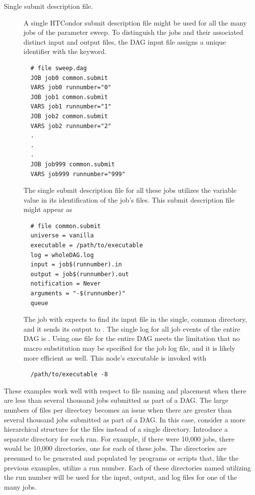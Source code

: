 \begin{description}
\item[Single submit description file.]
A single HTCondor submit description file might be used for all the many
jobs of the parameter sweep.
To distinguish the jobs and their associated distinct input and output files,
the DAG input file assigns a unique identifier with the  keyword.
\begin{verbatim}
  # file sweep.dag
  JOB job0 common.submit
  VARS job0 runnumber="0"
  JOB job1 common.submit
  VARS job1 runnumber="1"
  JOB job2 common.submit
  VARS job2 runnumber="2"
  .
  .
  .
  JOB job999 common.submit
  VARS job999 runnumber="999"
\end{verbatim}

The single submit description file for all these jobs utilizes the
 variable value in its identification of the job's
files. 
This submit description file might appear as
\begin{verbatim}
  # file common.submit
  universe = vanilla
  executable = /path/to/executable
  log = wholeDAG.log
  input = job$(runnumber).in
  output = job$(runnumber).out
  notification = Never
  arguments = "-$(runnumber)"
  queue
\end{verbatim}
The job with  expects to find its input file  
in the single, common directory, and it 
sends its output to .
The single log for all job events of the entire DAG is .
Using one file for the entire DAG meets the limitation that no macro
substitution may be specified for the job log file, 
and it is likely more efficient as well. 
This node's executable is invoked with
\begin{verbatim}
  /path/to/executable -8
\end{verbatim}

\end{description}

These examples work well with respect to file naming and placement
when there are less than several thousand jobs submitted as part
of a DAG.
The large numbers of files per directory becomes an issue when there
are greater than several thousand jobs submitted as part of a DAG.
In this case,
consider a more hierarchical structure for the files instead of a single
directory.
Introduce a separate directory for each run.
For example, if there were 10,000 jobs, there would be
10,000 directories, one for each of these jobs.
The directories are presumed to be generated and populated by 
programs or scripts that,
like the previous examples, utilize a run number.
Each of these directories named utilizing the run number will be used
for the input, output, and log files for one of the many jobs.

